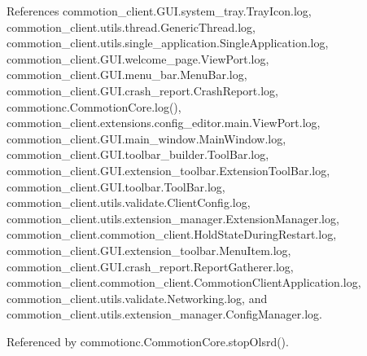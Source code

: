 References commotion\+\_\+client.\+G\+U\+I.\+system\+\_\+tray.\+Tray\+Icon.\+log, commotion\+\_\+client.\+utils.\+thread.\+Generic\+Thread.\+log, commotion\+\_\+client.\+utils.\+single\+\_\+application.\+Single\+Application.\+log, commotion\+\_\+client.\+G\+U\+I.\+welcome\+\_\+page.\+View\+Port.\+log, commotion\+\_\+client.\+G\+U\+I.\+menu\+\_\+bar.\+Menu\+Bar.\+log, commotion\+\_\+client.\+G\+U\+I.\+crash\+\_\+report.\+Crash\+Report.\+log, commotionc.\+Commotion\+Core.\+log(), commotion\+\_\+client.\+extensions.\+config\+\_\+editor.\+main.\+View\+Port.\+log, commotion\+\_\+client.\+G\+U\+I.\+main\+\_\+window.\+Main\+Window.\+log, commotion\+\_\+client.\+G\+U\+I.\+toolbar\+\_\+builder.\+Tool\+Bar.\+log, commotion\+\_\+client.\+G\+U\+I.\+extension\+\_\+toolbar.\+Extension\+Tool\+Bar.\+log, commotion\+\_\+client.\+G\+U\+I.\+toolbar.\+Tool\+Bar.\+log, commotion\+\_\+client.\+utils.\+validate.\+Client\+Config.\+log, commotion\+\_\+client.\+utils.\+extension\+\_\+manager.\+Extension\+Manager.\+log, commotion\+\_\+client.\+commotion\+\_\+client.\+Hold\+State\+During\+Restart.\+log, commotion\+\_\+client.\+G\+U\+I.\+extension\+\_\+toolbar.\+Menu\+Item.\+log, commotion\+\_\+client.\+G\+U\+I.\+crash\+\_\+report.\+Report\+Gatherer.\+log, commotion\+\_\+client.\+commotion\+\_\+client.\+Commotion\+Client\+Application.\+log, commotion\+\_\+client.\+utils.\+validate.\+Networking.\+log, and commotion\+\_\+client.\+utils.\+extension\+\_\+manager.\+Config\+Manager.\+log.



Referenced by commotionc.\+Commotion\+Core.\+stop\+Olsrd().


